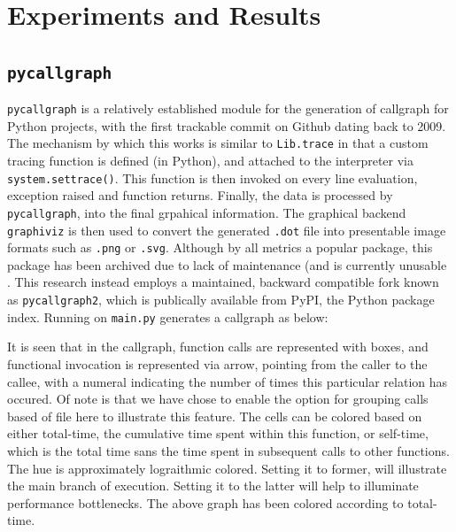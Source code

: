 \documentclass[conference]{IEEEtran}
\begin{document}
\section{Experiments and Results}
\subsection{\texttt{pycallgraph}}
\texttt{pycallgraph}\cite{pycallgraph} is a relatively established module for the generation of callgraph for Python projects, with the first trackable commit on Github dating back to 2009. The mechanism by which this works is similar to \texttt{Lib.trace} in that a custom tracing function is defined (in Python), and attached to the interpreter via \texttt{system.settrace()}. This function is then invoked on every line evaluation, exception raised and function returns. Finally, the data is processed by \texttt{pycallgraph}, into the final grpahical information. The graphical backend \texttt{graphiviz} is then used to convert the generated \texttt{.dot} file into presentable image formats such as \texttt{.png} or \texttt{.svg}. Although by all metrics a popular package, this package has been archived due to lack of maintenance (and is currently unusable . This research instead employs a maintained, backward compatible fork known as \texttt{pycallgraph2}\cite{pycallgraph2}, which is publically available from PyPI, the Python package index. Running on \texttt{main.py} generates a callgraph as below:\par
\begin{strip}
  \centering
    
  \label{thermal: callgraph}
\end{strip}
It is seen that in the callgraph, function calls are represented with boxes, and functional invocation is represented via arrow, pointing from the caller to the callee, with a numeral indicating the number of times this particular relation has occured. Of note is that we have chose to enable the option for grouping calls based of file here to illustrate this feature. The cells can be colored based on either total-time, the cumulative time spent within this function, or self-time, which is the total time sans the time spent in subsequent calls to other functions. The hue is approximately lograithmic colored. Setting it to former, will illustrate the main branch of execution. Setting it to the latter will help to illuminate performance bottlenecks. The above graph has been colored according to total-time.\par
\end{document}
